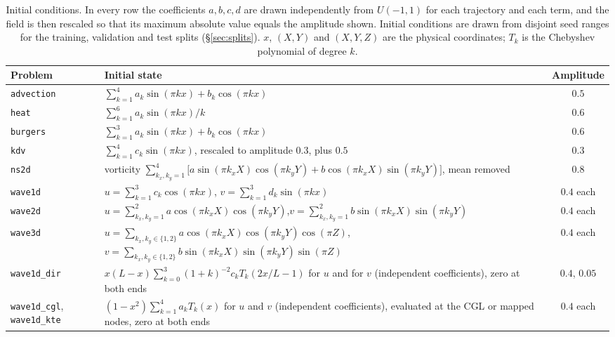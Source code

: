 \documentclass[11pt]{article}
\theoremstyle{definition}
\theoremstyle{remark}
\begin{document}
\begin{table}[htbp]
\centering
\caption{Initial conditions. In every row the coefficients $a,b,c,d$ are drawn
independently from $U(-1,1)$ for each trajectory and each term, and the field is
then rescaled so that its maximum absolute value equals the amplitude shown.
Initial conditions are drawn from disjoint seed ranges for the training,
validation and test splits (\S\ref{sec:splits}). $x$, $(X,Y)$ and $(X,Y,Z)$ are
the physical coordinates; $T_k$ is the Chebyshev polynomial of degree $k$.}
\label{tab:ics}
\footnotesize
\renewcommand{\arraystretch}{1.35}
\begin{tabular}{@{}l>{\raggedright\arraybackslash}p{97mm}c@{}}
\toprule
Problem & Initial state & Amplitude \\
\midrule
\texttt{advection} & $\sum_{k=1}^{4}a_k\sin(\pi kx)+b_k\cos(\pi kx)$ & $0.5$ \\
\texttt{heat} & $\sum_{k=1}^{6}a_k\sin(\pi kx)/k$ & $0.6$ \\
\texttt{burgers} & $\sum_{k=1}^{3}a_k\sin(\pi kx)+b_k\cos(\pi kx)$ & $0.6$ \\
\texttt{kdv} & $\sum_{k=1}^{4}c_k\sin(\pi kx)$, rescaled to amplitude $0.3$, plus $0.5$ & $0.3$ \\
\texttt{ns2d} & vorticity $\sum_{k_x,k_y=1}^{4}\big[a\sin(\pi k_xX)\cos(\pi k_yY)+b\cos(\pi k_xX)\sin(\pi k_yY)\big]$, mean removed & $0.8$ \\
\midrule
\texttt{wave1d} & $u=\sum_{k=1}^{3}c_k\cos(\pi kx)$, $v=\sum_{k=1}^{3}d_k\sin(\pi kx)$ & $0.4$ each \\
\texttt{wave2d} & $u=\sum_{k_x,k_y=1}^{2}a\cos(\pi k_xX)\cos(\pi k_yY)$,\newline $v=\sum_{k_x,k_y=1}^{2}b\sin(\pi k_xX)\sin(\pi k_yY)$ & $0.4$ each \\
\texttt{wave3d} & $u=\sum_{k_x,k_y\in\{1,2\}}a\cos(\pi k_xX)\cos(\pi k_yY)\cos(\pi Z)$,\newline $v=\sum_{k_x,k_y\in\{1,2\}}b\sin(\pi k_xX)\sin(\pi k_yY)\sin(\pi Z)$ & $0.4$ each \\
\texttt{wave1d\_dir} & $x(L-x)\sum_{k=0}^{3}(1+k)^{-2}c_kT_k(2x/L-1)$ for $u$ and for $v$ (independent coefficients), zero at both ends & $0.4$, $0.05$ \\
\texttt{wave1d\_cgl}, \texttt{wave1d\_kte} & $(1-x^2)\sum_{k=1}^{4}a_kT_k(x)$ for $u$ and $v$ (independent coefficients), evaluated at the CGL or mapped nodes, zero at both ends & $0.4$ each \\
\bottomrule
\end{tabular}
\end{table}
\end{document}
